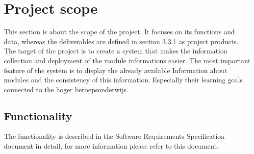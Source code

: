 \section{Project scope}
This section is about the scope of the project. It focuses on its functions and data, whereas the deliverables
are defined in section 3.3.1 as project products.
\newline \\
The target of the project is to create a system that makes the information collection and deployment of the module informations
easier. The most important feature of the system is to display the already available Information about modules and the consistency
of this information. Especially their learning goals connected to the hoger beroepsonderwijs.
    
    \subsection{Functionality}
    The functionality is described in the Software Requirements Specification document in detail,
    for more information please refer to this document.


